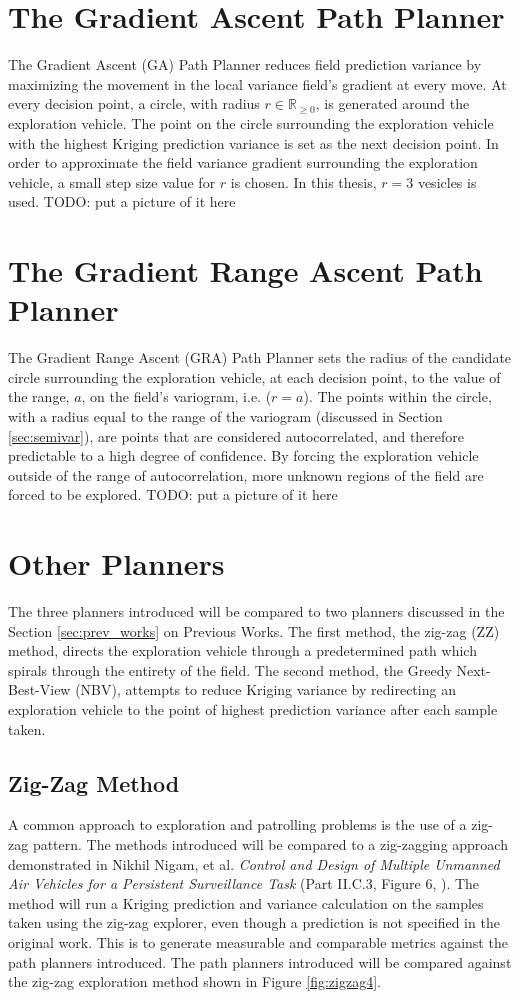 \section{The Gradient Ascent Path Planner}
The Gradient Ascent (GA) Path Planner reduces field prediction variance by maximizing the movement in the local variance field's gradient at every move. At every decision point, a circle, with radius $r \in \mathbb{R}_{\geq 0}$, is generated around the exploration vehicle. The point on the circle surrounding the exploration vehicle with the highest Kriging prediction variance is set as the next decision point. In order to approximate the field variance gradient surrounding the exploration vehicle, a small step size value for $r$ is chosen. In this thesis, $r=3$ vesicles is used.
TODO: put a picture of it here

\section{The Gradient Range Ascent Path Planner}
The Gradient Range Ascent (GRA) Path Planner sets the radius of the candidate circle surrounding the exploration vehicle, at each decision point, to the value of the range, $a$, on the field's variogram, i.e. ($r = a$). The points within the circle, with a radius equal to the range of the variogram (discussed in Section \ref{sec:semivar}), are points that are considered autocorrelated, and therefore predictable to a high degree of confidence. By forcing the exploration vehicle outside of the range of autocorrelation, more unknown regions of the field are forced to be explored.
TODO: put a picture of it here

\section{Other Planners}
The three planners introduced will be compared to two planners discussed in the Section \ref{sec:prev_works} on Previous Works. The first method, the zig-zag (ZZ) method, directs the exploration vehicle through a predetermined path which spirals through the entirety of the field. The second method, the Greedy Next-Best-View (NBV), attempts to reduce Kriging variance by redirecting an exploration vehicle to the point of highest prediction variance after each sample taken.

\subsection{Zig-Zag Method}
A common approach to exploration and patrolling problems is the use of a zig-zag pattern. The methods introduced will be compared to a zig-zagging approach demonstrated in Nikhil Nigam, et al. \textit{Control and Design of Multiple Unmanned Air Vehicles for a Persistent Surveillance Task} (Part II.C.3, Figure 6, \cite{nigam:zigzag}). The method will run a Kriging prediction and variance calculation on the samples taken using the zig-zag explorer, even though a prediction is not specified in the original work. This is to generate measurable and comparable metrics against the path planners introduced. The path planners introduced will be compared against the zig-zag exploration method shown in Figure \ref{fig:zigzag4}.

